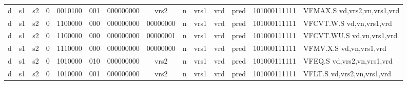 \begin{landscape}
\begin{table}[p]
\begin{small}
\begin{center}
\begin{tabular}{p{0.08in}@{}p{0.08in}@{}p{0.08in}@{}p{0.08in}@{}p{0.50in}@{}p{0.30in}@{}p{0.08in}@{}p{0.8in}@{}p{0.48in}@{}p{0.32in}@{}p{0.08in}@{}p{0.8in}@{}p{0.8in}@{}p{0.4in}@{}p{0.56in}l}
\multicolumn{1}{|c|}{d} &
\multicolumn{1}{c|}{s1} &
\multicolumn{1}{c|}{s2} &
\multicolumn{1}{c|}{0} &
\multicolumn{1}{c|}{0010100} &
\multicolumn{1}{c|}{001} &
\multicolumn{2}{c|}{000000000} &
\multicolumn{2}{c|}{vrs2} &
\multicolumn{1}{c|}{n} &
\multicolumn{1}{c|}{vrs1} &
\multicolumn{1}{c|}{vrd} &
\multicolumn{1}{c|}{pred} &
\multicolumn{1}{c|}{101000111111} & VFMAX.S vd,vrs2,vn,vrs1,vrd \\
\cline{1-15}
  

\multicolumn{1}{|c|}{d} &
\multicolumn{1}{c|}{s1} &
\multicolumn{1}{c|}{s2} &
\multicolumn{1}{c|}{0} &
\multicolumn{1}{c|}{1100000} &
\multicolumn{1}{c|}{000} &
\multicolumn{2}{c|}{000000000} &
\multicolumn{2}{c|}{00000000} &
\multicolumn{1}{c|}{n} &
\multicolumn{1}{c|}{vrs1} &
\multicolumn{1}{c|}{vrd} &
\multicolumn{1}{c|}{pred} &
\multicolumn{1}{c|}{101000111111} & VFCVT.W.S vd,vn,vrs1,vrd \\
\cline{1-15}
  

\multicolumn{1}{|c|}{d} &
\multicolumn{1}{c|}{s1} &
\multicolumn{1}{c|}{s2} &
\multicolumn{1}{c|}{0} &
\multicolumn{1}{c|}{1100000} &
\multicolumn{1}{c|}{000} &
\multicolumn{2}{c|}{000000000} &
\multicolumn{2}{c|}{00000001} &
\multicolumn{1}{c|}{n} &
\multicolumn{1}{c|}{vrs1} &
\multicolumn{1}{c|}{vrd} &
\multicolumn{1}{c|}{pred} &
\multicolumn{1}{c|}{101000111111} & VFCVT.WU.S vd,vn,vrs1,vrd \\
\cline{1-15}
  

\multicolumn{1}{|c|}{d} &
\multicolumn{1}{c|}{s1} &
\multicolumn{1}{c|}{s2} &
\multicolumn{1}{c|}{0} &
\multicolumn{1}{c|}{1110000} &
\multicolumn{1}{c|}{000} &
\multicolumn{2}{c|}{000000000} &
\multicolumn{2}{c|}{00000000} &
\multicolumn{1}{c|}{n} &
\multicolumn{1}{c|}{vrs1} &
\multicolumn{1}{c|}{vrd} &
\multicolumn{1}{c|}{pred} &
\multicolumn{1}{c|}{101000111111} & VFMV.X.S vd,vn,vrs1,vrd \\
\cline{1-15}
  

\multicolumn{1}{|c|}{d} &
\multicolumn{1}{c|}{s1} &
\multicolumn{1}{c|}{s2} &
\multicolumn{1}{c|}{0} &
\multicolumn{1}{c|}{1010000} &
\multicolumn{1}{c|}{010} &
\multicolumn{2}{c|}{000000000} &
\multicolumn{2}{c|}{vrs2} &
\multicolumn{1}{c|}{n} &
\multicolumn{1}{c|}{vrs1} &
\multicolumn{1}{c|}{vrd} &
\multicolumn{1}{c|}{pred} &
\multicolumn{1}{c|}{101000111111} & VFEQ.S vd,vrs2,vn,vrs1,vrd \\
\cline{1-15}
  

\multicolumn{1}{|c|}{d} &
\multicolumn{1}{c|}{s1} &
\multicolumn{1}{c|}{s2} &
\multicolumn{1}{c|}{0} &
\multicolumn{1}{c|}{1010000} &
\multicolumn{1}{c|}{001} &
\multicolumn{2}{c|}{000000000} &
\multicolumn{2}{c|}{vrs2} &
\multicolumn{1}{c|}{n} &
\multicolumn{1}{c|}{vrs1} &
\multicolumn{1}{c|}{vrd} &
\multicolumn{1}{c|}{pred} &
\multicolumn{1}{c|}{101000111111} & VFLT.S vd,vrs2,vn,vrs1,vrd \\
\cline{1-15}
  


\end{tabular}
\end{center}
\end{small}
\end{table}
\end{landscape}
